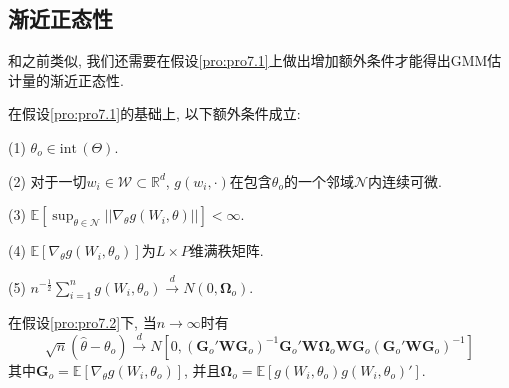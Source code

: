 \documentclass[cn, 12pt, math=mtpro2, bibstyle=apa, blue, twocol]{elegantbook}
\newcommand{\R}{\mathbb{R}}
\newcommand{\E}{\mathbb{E}}
\newcommand{\W}{\mathbold{W}}
\newcommand{\BO}{\mathbold{\Omega}}
\begin{document}
\subsection{渐近正态性}
和之前类似, 我们还需要在假设\ref{pro:pro7.1}上做出增加额外条件才能得出GMM估计量的渐近正态性.
\begin{proposition}\label{pro:pro7.2}
在假设\ref{pro:pro7.1}的基础上, 以下额外条件成立:

(1) $\theta_o\in\text{int}\,(\Theta)$.

(2) 对于一切$w_i\in \mathscr{W}\subset\R^d$, $g(w_i,\cdot)$在包含$\theta_o$的一个邻域$\mathscr{N}$内连续可微.

(3) $\E[\sup_{\theta\in \mathscr{N}}||\nabla_\theta g(W_i,\theta)||]<\infty$.

(4) $\E[\nabla_\theta g(W_i,\theta_o)]$为$L\times P$维满秩矩阵.

(5) $n^{-\frac{1}{2}}\sum_{i=1}^{n}g(W_i,\theta_o)\xrightarrow{d} N(0,\BO_o)$.
\end{proposition}
\begin{theorem}\label{thm:thm7.3}
  在假设\ref{pro:pro7.2}下, 当$n\to\infty$时有
  $$\sqrt{n}(\hat{\theta}-\theta_o)\xrightarrow{d}N[0,(\mathbold{G}_o'\W\mathbold{G}_o)^{-1}\mathbold{G}_o'\W\BO_o\W\mathbold{G}_o(\mathbold{G}_o'\W\mathbold{G}_o)^{-1}]$$
  其中$\mathbold{G}_o=\E[\nabla_\theta g(W_i,\theta_o)]$, 并且$\BO_o=\E[g(W_i,\theta_o)g(W_i,\theta_o)']$.
\end{theorem}
\end{document}
